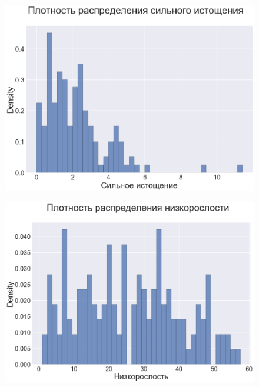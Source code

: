 \documentclass{beamer}
\begin{document}
\begin{frame}

\begin{figure}
	\centering
	\includegraphics[width=120mm]{6.png}
\end{figure}


\end{frame}



\begin{frame}

\begin{figure}
	\centering
	\includegraphics[width=120mm]{7.png}
\end{figure}


\end{frame}
\end{document}
